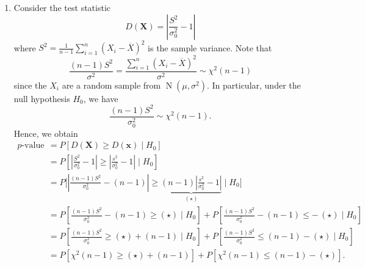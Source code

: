 \documentclass[10pt]{article}
\DeclareMathOperator{\Nor}{N}
\theoremstyle{newstyle}
\begin{document}
{\begin{enumerate}[(1)]
    \item Consider the test statistic 
    \[ D(\mathbf X) = \left| \frac{S^2}{\sigma_0^2} - 1 \right| \]
    where $S^2 = \frac1{n-1} \sum_{i=1}^n (X_i - \overline X)^2$ is the sample variance. 
    Note that 
    \[ \frac{(n-1)S^2}{\sigma^2} = \frac{\sum_{i=1}^n (X_i - \overline X)^2}{\sigma^2} 
    \sim \chi^2(n-1) \]
    since the $X_i$ are a random sample from $\Nor(\mu, \sigma^2)$. In particular, 
    under the null hypothesis $H_0$, we have 
    \[ \frac{(n-1)S^2}{\sigma_0^2} \sim \chi^2(n-1). \] 
    Hence, we obtain 
    \begin{align*}
        \text{$p$-value}
        &= P[D(\mathbf X) \geq D(\mathbf x) \mid H_0] \\
        &= P\left[ \left| \frac{S^2}{\sigma_0^2} - 1 \right| 
        \geq \left| \frac{s^2}{\sigma_0^2} - 1 \right| \; \Bigg| \; H_0 \right] \\
        &= P\Bigg[ \left| \frac{(n-1)S^2}{\sigma_0^2} - (n-1) \right| \geq \underbrace{(n-1) 
        \left| \frac{s^2}{\sigma_0^2} - 1 \right|}_{(\star)} \;\Bigg|\; H_0 \Bigg] \\
        &= P\left[ \frac{(n-1)S^2}{\sigma_0^2} - (n-1) \geq (\star) \;\Bigg|\; H_0 \right] 
        + P\left[ \frac{(n-1)S^2}{\sigma_0^2} - (n-1)  \leq -\,(\star) \;\Bigg|\; H_0 \right] \\
        &= P \left[ \frac{(n-1)S^2}{\sigma_0^2} \geq (\star) + (n-1) \;\Bigg|\; H_0 \right] 
        + P \left[ \frac{(n-1)S^2}{\sigma_0^2} \leq (n-1) - (\star) \;\Bigg|\; H_0 \right] \\
        &= P\left[ \chi^2(n-1) \geq (\star) + (n-1)\right] + P\left[\chi^2(n-1) \leq (n-1)-(\star)\right]. 
    \end{align*}
    

\end{enumerate}}
\end{document}
